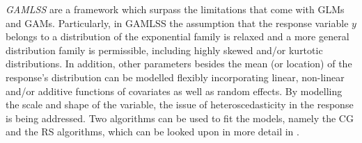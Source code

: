 
\textit{\ac{GAMLSS}} \citep{rigby2001gamlss, rigby2005generalized} are a framework which surpass the limitations that come with \acp{GLM} and \acp{GAM}. Particularly, in \ac{GAMLSS} the assumption that the response variable $y$ belongs to a distribution of the exponential family is relaxed and a more general distribution family is permissible, including highly skewed and/or kurtotic distributions. In addition, other parameters besides the mean (or location) of the response's distribution can be modelled flexibly incorporating linear, non-linear and/or additive functions of covariates as well as random effects. By modelling the scale and shape of the variable, the issue of heteroscedasticity in the response is being addressed. Two algorithms can be used to fit the models, namely the CG and the RS algorithms, which can be looked upon in more detail in \cite{rigby2005generalized}.
\\

